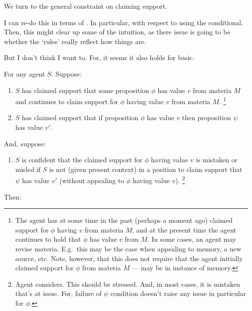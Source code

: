 \begin{note}[\nI{}]
  We turn to the general constraint on claiming support.
  \begin{proposition}[\nI{-}  --- \nI{}]\label{prem:ni}
    {
      \color{red}
      I can re-do this in terms of \nr{}.
      In particular, \nr{} with respect to using the conditional.
      Then, this might clear up some of the intuition, as there issue is going to be whether the `rules' really reflect how things are.

      But I don't think I want to.
      For, it seems it also holds for basic\AR{}.
    }
    For any agent \(S\).
    Suppose:
    \begin{enumerate}[ref=(\textsf{NI}:\arabic*), series=nI_counter]
    \item\label{nI:claimed-support} \(S\) has claimed support that some proposition \(\phi\) has value \(v\) from materia \(M\) and continues to claim support for \(\phi\) having value \(v\) from materia \(M\).\nolinebreak
      \footnote{
        The agent has at some time in the past (perhaps a moment ago) claimed support for \(\phi\) having \(v\) from materia \(M\), and at the present time the agent continues to hold that \(\phi\) has value \(v\) from \(M\).
        In some cases, an agent may revise materia.
        E.g.\ this may be the case when appealing to memory, a new source, etc.
        Note, however, that this does not require that the agent initially claimed support for \(\phi\) from materia \(M\) --- may be in instance of memory.
      }
    \item\label{nI:received-info} \(S\) has claimed support that if proposition \(\phi\) has value \(v\) then proposition \(\psi\) has value \(v'\).
    \end{enumerate}
    And, suppose:
    \begin{enumerate}[ref=(\textsf{NI}:\arabic*), resume*=nI_counter]
    \item\label{nI:inclusion} \(S\) is confident that the claimed support for \(\phi\) having value \(v\) is mistaken or misled if \(S\) is not (given present context) in a position to claim support that \(\psi\) has value \(v'\) (without appealing to \(\phi\) having value \(v\)).\nolinebreak
      \footnote{
        Agent considers.
        This should be stressed.
        And, in most cases, it is mistaken that's at issue.
        For, failure of \(\psi\) condition doesn't raise any issue in particular for \(\phi\).
      }
    \end{enumerate}
    Then:
    \begin{enumerate}[ref=(\textsf{NI}:\arabic*), resume*=nI_counter]

\end{enumerate}
\end{proposition}
\end{note}
